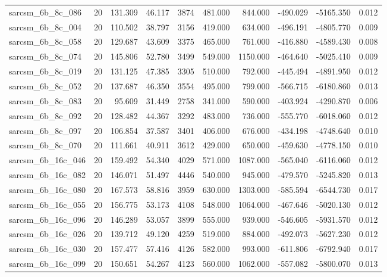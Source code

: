 \begin{tabular}{lrrrrrrrrr}
sarcsm\_6b\_8c\_086 & 20 & 131.309 & 46.117 & 3874 & 481.000 & 844.000 & -490.029 & -5165.350 & 0.012 \\
sarcsm\_6b\_8c\_004 & 20 & 110.502 & 38.797 & 3156 & 419.000 & 634.000 & -496.191 & -4805.770 & 0.009 \\
sarcsm\_6b\_8c\_058 & 20 & 129.687 & 43.609 & 3375 & 465.000 & 761.000 & -416.880 & -4589.430 & 0.008 \\
sarcsm\_6b\_8c\_074 & 20 & 145.806 & 52.780 & 3499 & 549.000 & 1150.000 & -464.640 & -5025.410 & 0.009 \\
sarcsm\_6b\_8c\_019 & 20 & 131.125 & 47.385 & 3305 & 510.000 & 792.000 & -445.494 & -4891.950 & 0.012 \\
sarcsm\_6b\_8c\_052 & 20 & 137.687 & 46.350 & 3554 & 495.000 & 799.000 & -566.715 & -6180.860 & 0.013 \\
sarcsm\_6b\_8c\_083 & 20 & 95.609 & 31.449 & 2758 & 341.000 & 590.000 & -403.924 & -4290.870 & 0.006 \\
sarcsm\_6b\_8c\_092 & 20 & 128.482 & 44.367 & 3292 & 483.000 & 736.000 & -555.770 & -6018.060 & 0.012 \\
sarcsm\_6b\_8c\_097 & 20 & 106.854 & 37.587 & 3401 & 406.000 & 676.000 & -434.198 & -4748.640 & 0.010 \\
sarcsm\_6b\_8c\_070 & 20 & 111.661 & 40.911 & 3612 & 429.000 & 650.000 & -459.630 & -4778.150 & 0.010 \\
sarcsm\_6b\_16c\_046 & 20 & 159.492 & 54.340 & 4029 & 571.000 & 1087.000 & -565.040 & -6116.060 & 0.012 \\
sarcsm\_6b\_16c\_082 & 20 & 146.071 & 51.497 & 4446 & 540.000 & 945.000 & -479.570 & -5245.820 & 0.013 \\
sarcsm\_6b\_16c\_080 & 20 & 167.573 & 58.816 & 3959 & 630.000 & 1303.000 & -585.594 & -6544.730 & 0.017 \\
sarcsm\_6b\_16c\_055 & 20 & 156.775 & 53.173 & 4108 & 548.000 & 1064.000 & -467.646 & -5020.130 & 0.012 \\
sarcsm\_6b\_16c\_096 & 20 & 146.289 & 53.057 & 3899 & 555.000 & 939.000 & -546.605 & -5931.570 & 0.012 \\
sarcsm\_6b\_16c\_026 & 20 & 139.712 & 49.120 & 4259 & 519.000 & 884.000 & -492.073 & -5627.230 & 0.012 \\
sarcsm\_6b\_16c\_030 & 20 & 157.477 & 57.416 & 4126 & 582.000 & 993.000 & -611.806 & -6792.940 & 0.017 \\
sarcsm\_6b\_16c\_099 & 20 & 150.651 & 54.267 & 4123 & 560.000 & 1062.000 & -557.082 & -5800.070 & 0.013 \\

\end{tabular}
